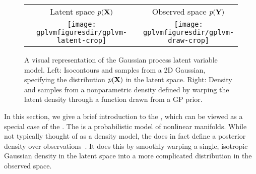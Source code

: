 \begin{figure}
\begin{centering}
{\begin{tabular}{cccc}
\phantom{h} & Latent space $p(\mathbf{X})$ & & Observed space $p(\mathbf{Y})$ \\
& \fbox{\texttt{[image: \\gplvmfiguresdir/gplvm-latent-crop]}} &
\raisebox{7em}{$\overset{\mathlarger{f(x)}}{\mathlarger{\mathlarger{\mathlarger{\mathlarger{\mathlarger{\mathlarger{\mathlarger{\rightarrow}}}}}}}}$} &
\fbox{\texttt{[image: \\gplvmfiguresdir/gplvm-draw-crop]}}
\end{tabular}}
\end{centering}
\caption[Two-dimensional Gaussian process latent variable model]{A visual representation of the Gaussian process latent variable model.  Left:  Isocontours and samples from a 2D Gaussian, specifying the distribution $p(\mathbf{X})$ in the latent space.  Right: Density and samples from a nonparametric density defined by warping the latent density through a function drawn from a GP prior.}  
\label{fig:twod-gplvm}
\end{figure}



In this section, we give a brief introduction to the \gplvm{}, which can be viewed as a special case of the \iwmm{}.
The \gplvm{} is a probabilistic model of nonlinear manifolds.
While not typically thought of as a density model, the \gplvm{} does in fact define a posterior density over observations~\citep{nickisch2010gaussian}.
It does this by smoothly warping a single, isotropic Gaussian density in the latent space into a more complicated distribution in the observed space.  



